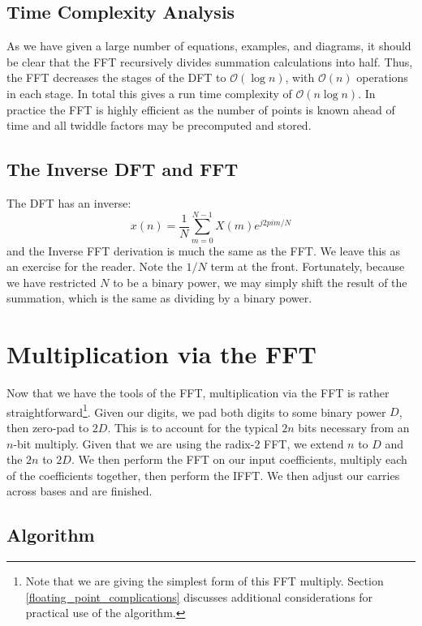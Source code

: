 \documentclass[psamsfonts,reqno]{amsart}
\theoremstyle{definition}
\theoremstyle{remark}
\numberwithin{equation}{section}
\begin{document}
\subsection{Time Complexity Analysis \nopunct}

As we have given a large number of equations, examples, and diagrams, it should be clear that the FFT recursively divides summation calculations into half. Thus, the FFT decreases the stages of the DFT to $\mathcal{O}(\log{n})$, with $\mathcal{O}(n)$ operations in each stage. In total this gives a run time complexity of $\mathcal{O}(n \log{n})$. In practice the FFT is highly efficient as the number of points is known ahead of time and all twiddle factors may be precomputed and stored.

\subsection{The Inverse DFT and FFT}

The DFT has an inverse:
\begin{equation*}
	x(n) = \frac{1}{N} \sum_{m=0}^{N-1} X(m) e^{j 2 pi m / N}
\end{equation*}
and the Inverse FFT derivation is much the same as the FFT. We leave this as an exercise for the reader. Note the $1/N$ term at the front. Fortunately, because we have restricted $N$ to be a binary power, we may simply shift the result of the summation, which is the same as dividing by a binary power.

\section{Multiplication via the FFT}
Now that we have the tools of the FFT, multiplication via the FFT is rather straightforward\footnote{Note that we are giving the simplest form of this FFT multiply. Section \ref{floating_point_complications} discusses additional considerations for practical use of the algorithm.}. Given our digits, we pad both digits to some binary power $D$, then zero-pad to $2D$. This is to account for the typical $2n$ bits necessary from an $n$-bit multiply. Given that we are using the radix-2 FFT, we extend $n$ to $D$ and the $2n$ to $2D$. We then perform the FFT on our input coefficients, multiply each of the coefficients together, then perform the IFFT. We then adjust our carries across bases and are finished. 



\subsection{Algorithm \nopunct}
\end{document}
